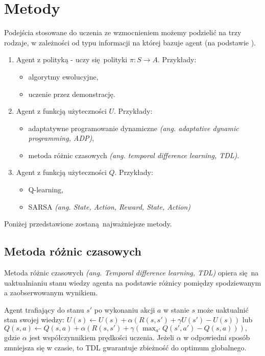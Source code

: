 \section{Metody}\label{methods}

Podejścia stosowane do uczenia ze wzmocnieniem możemy podzielić na trzy rodzaje, w zależności od typu informacji na której bazuje agent (na podstawie \cite{Russell:2009:AIM:1671238}).

\begin{enumerate}
\item Agent z polityką - uczy się polityki  $\pi: S \rightarrow A$. Przykłady:
\begin{itemize}
\item algorytmy ewolucyjne,
\item uczenie przez demonstrację.
\end{itemize}
\item Agent z funkcją użyteczności $U$. Przykłady:
\begin{itemize}
\item adaptatywne programowanie dynamiczne \textit{(ang. adaptative dynamic programming, ADP)},
\item metoda różnic czasowych \textit{(ang. temporal difference learning, TDL)}.
\end{itemize}
\item Agent z funkcją użyteczności $Q$. Przykłady:
\begin{itemize}
\item Q-learning,
\item SARSA \textit{(ang. State, Action, Reward, State, Action)}
\end{itemize}
\end{enumerate}

Poniżej przedstawione zostaną najważniejsze metody.

\subsection{Metoda różnic czasowych}\label{tdl}

Metoda różnic czasowych \textit{(ang. Temporal difference learning, TDL)} \cite{Sutton:1988:LPM:637912.637937} opiera się na uaktualnianiu stanu wiedzy agenta na podstawie różnicy pomiędzy spodziewanym a zaobserwowanym wynikiem.

Agent trafiający do stanu $s'$ po wykonaniu akcji $a$ w stanie $s$ może uaktualnić stan swojej wiedzy: $U(s) \leftarrow U(s) + \alpha (R(s,s') + \gamma U(s') - U (s))$ lub $Q(s,a) \leftarrow Q(s,a) + \alpha (R(s,s') + \gamma (\max_{a'}Q(s',a') - Q (s,a))),$ gdzie $\alpha$ jest współczynnikiem prędkości uczenia. Jeżeli $\alpha$ w odpowiedni sposób zmniejsza się w czasie, to TDL gwarantuje zbieżność do optimum globalnego.

